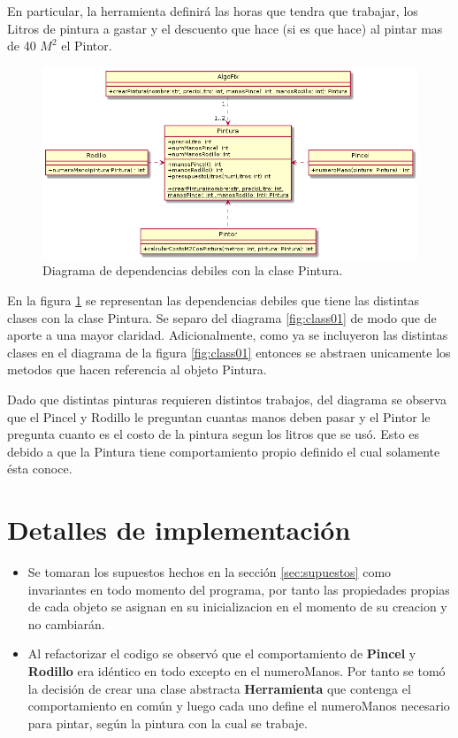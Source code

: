 \documentclass[titlepage,a4paper]{article}
\begin{document}
  En particular, la herramienta definirá las horas que tendra que trabajar, los Litros de pintura a gastar y 
  el descuento que hace (si es que hace) al pintar mas de 40 $M^2$ el Pintor. 

\begin{figure}[H]
\centering
\includegraphics[width=1\textwidth]{diagrama_clase02.png}
\caption{\label{fig:class02}Diagrama de dependencias debiles con la clase Pintura.}
\end{figure}

En la figura \ref{fig:class02} se representan las dependencias debiles que tiene las distintas clases con la clase Pintura. Se separo del diagrama \ref{fig:class01} de modo que
 de aporte a una mayor claridad. Adicionalmente, como ya se incluyeron las distintas clases en el diagrama de la figura \ref{fig:class01} 
entonces se abstraen unicamente los metodos que hacen referencia al objeto Pintura.\newline

Dado que distintas pinturas requieren distintos trabajos, del diagrama se observa que el Pincel y Rodillo le preguntan cuantas manos deben pasar y el Pintor le pregunta
cuanto es el costo de la pintura segun los litros que se usó. Esto es debido a que la Pintura tiene comportamiento propio definido el cual solamente ésta conoce.


\section{Detalles de implementación}\label{sec:implementacion}
\begin{itemize}  
  \item Se tomaran los supuestos hechos en la sección \ref{sec:supuestos} como invariantes en todo momento del programa,
  por tanto las propiedades propias de cada objeto se asignan en su inicializacion en el momento de su creacion y no cambiarán.

  \item Al refactorizar el codigo se observó que el comportamiento de \textbf{Pincel} y \textbf{Rodillo} era idéntico en todo excepto en el numeroManos. 
  Por tanto se tomó la decisión de crear una clase abstracta \textbf{Herramienta} que contenga el comportamiento en común y luego cada uno define el numeroManos 
  necesario para pintar, según la pintura con la cual se trabaje.
\end{itemize}
\end{document}
